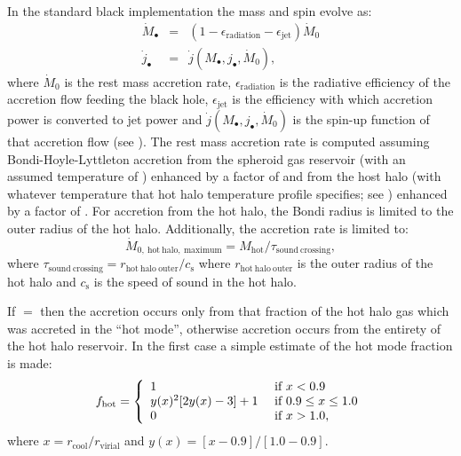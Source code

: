 In the standard black implementation the mass and spin evolve as:
\begin{eqnarray}
\dot{M}_\bullet &=& (1-\epsilon_\mathrm{radiation}-\epsilon_\mathrm{jet}) \dot{M}_0 \\
\dot{j}_\bullet &=& \dot{j}(M_\bullet,j_\bullet,\dot{M}_0),
\end{eqnarray}
where $\dot{M}_0$ is the rest mass accretion rate, $\epsilon_\mathrm{radiation}$ is the radiative efficiency of the accretion flow feeding the black hole, $\epsilon_\mathrm{jet}$ is the efficiency with which accretion power is converted to jet power and $\dot{j}(M_\bullet,j_\bullet,\dot{M}_0)$ is the spin-up function of that accretion flow (see ). The rest mass accretion rate is computed assuming Bondi-Hoyle-Lyttleton accretion from the spheroid gas reservoir (with an assumed temperature of \mono{[bondiHoyleAccretionTemperatureSpheroid]}) enhanced by a factor of \mono{[bondiHoyleAccretionEnhancementSpheroid]} and from the host halo (with whatever temperature that hot halo temperature profile specifies; see ) enhanced by a factor of \mono{[bondiHoyleAccretionEnhancementHotHalo]}. For accretion from the hot halo, the Bondi radius is limited to the outer radius of the hot halo. Additionally, the accretion rate is limited to:
\begin{equation}
 \dot{M}_\mathrm{0,~hot~halo,~maximum} = M_\mathrm{hot}/\tau_\mathrm{sound~crossing},
\end{equation}
where $\tau_\mathrm{sound~crossing}=r_\mathrm{hot~halo~outer}/c_\mathrm{s}$ where $r_\mathrm{hot~halo~outer}$ is the outer radius of the hot halo and $c_\mathrm{s}$ is the speed of sound in the hot halo.

If \mono{[bondiHoyleAccretionHotModeOnly]}$=$ then the accretion occurs only from that fraction of the hot halo gas which was accreted in the ``hot mode'', otherwise accretion 
occurs from the entirety of the hot halo reservoir. In the first case a simple estimate of the hot mode fraction is made:
\begin{equation}
f_\mathrm{hot} = \left\{ \begin{array}{ll} 1 & \hbox{ if } x < 0.9 \\ y(x)^2[2 y(x) - 3]+1  & \hbox{ if } 0.9 \le x \le 1.0 \\ 0 & \hbox{ if } x > 1.0, \end{array} \right.
\end{equation}
where $x = r_\mathrm{cool}/r_\mathrm{virial}$ and $y(x)=[x-0.9]/[1.0-0.9]$.

